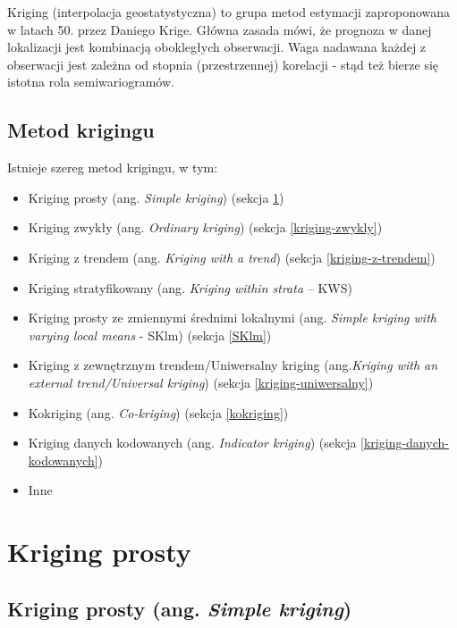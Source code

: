 \documentclass[
  paper=6in:9in,pagesize=pdftex,headinclude=on,footinclude=on,10pt]{scrbook}
\providecommand{\tightlist}{%
  \setlength{\itemsep}{0pt}\setlength{\parskip}{0pt}}
\begin{document}
Kriging (interpolacja geostatystyczna) to grupa metod estymacji zaproponowana w latach 50. przez Daniego Krige.
Główna zasada mówi, że prognoza w danej lokalizacji jest kombinacją obokległych obserwacji.
Waga nadawana każdej z obserwacji jest zależna od stopnia (przestrzennej) korelacji - stąd też bierze się istotna rola semiwariogramów.

\subsection{Metod krigingu}\label{metod-krigingu}

Istnieje szereg metod krigingu, w tym:

\begin{itemize}
\tightlist
\item
  Kriging prosty (ang. \emph{Simple kriging}) (sekcja \ref{kriging-prosty})
\item
  Kriging zwykły (ang. \emph{Ordinary kriging}) (sekcja \ref{kriging-zwykly})
\item
  Kriging z trendem (ang. \emph{Kriging with a trend}) (sekcja \ref{kriging-z-trendem})
\item
  Kriging stratyfikowany (ang. \emph{Kriging within strata} -- KWS)
\item
  Kriging prosty ze zmiennymi średnimi lokalnymi (ang. \emph{Simple kriging with varying local means} - SKlm) (sekcja \ref{SKlm})
\item
  Kriging z zewnętrznym trendem/Uniwersalny kriging (ang.\emph{Kriging with an external trend/Universal kriging}) (sekcja \ref{kriging-uniwersalny})
\item
  Kokriging (ang. \emph{Co-kriging}) (sekcja \ref{kokriging})
\item
  Kriging danych kodowanych (ang. \emph{Indicator kriging}) (sekcja \ref{kriging-danych-kodowanych})
\item
  Inne
\end{itemize}

\section{Kriging prosty}\label{kriging-prosty}

\subsection{\texorpdfstring{Kriging prosty (ang. \emph{Simple kriging})}{Kriging prosty (ang. Simple kriging)}}\label{kriging-prosty-ang.-simple-kriging}
\end{document}
